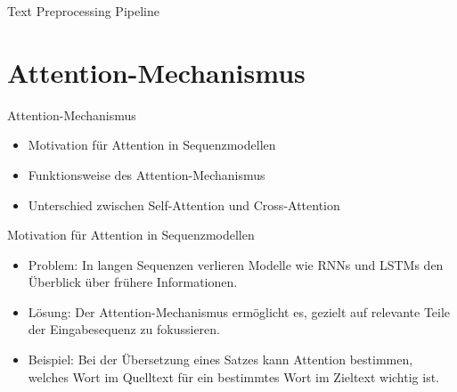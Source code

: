 \documentclass[aspectratio=1610, xcolor=dvipsnames, 9pt]{beamer}
\begin{document}
\begin{frame}{Text Preprocessing Pipeline}
\end{frame}

\section{Attention-Mechanismus}

\begin{frame}{Attention-Mechanismus}
  \begin{itemize}
    \item Motivation für Attention in Sequenzmodellen \\
    \item Funktionsweise des Attention-Mechanismus \\
    \item Unterschied zwischen Self-Attention und Cross-Attention
  \end{itemize}
\end{frame}

\begin{frame}{Motivation für Attention in Sequenzmodellen}
  \begin{itemize}
    \item Problem: In langen Sequenzen verlieren Modelle wie RNNs und LSTMs den Überblick über frühere Informationen. \\
    \item Lösung: Der Attention-Mechanismus ermöglicht es, gezielt auf relevante Teile der Eingabesequenz zu fokussieren. \\
    \item Beispiel: Bei der Übersetzung eines Satzes kann Attention bestimmen, welches Wort im Quelltext für ein bestimmtes Wort im Zieltext wichtig ist.
  \end{itemize}
\end{frame}
\end{document}
